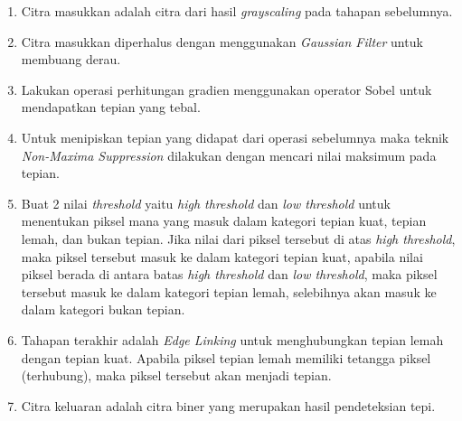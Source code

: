 \begin{enumerate}[leftmargin=16pt]
\item Citra masukkan adalah citra dari hasil \textit{grayscaling} pada tahapan sebelumnya.
\item Citra masukkan diperhalus dengan menggunakan \textit{Gaussian Filter} untuk membuang derau.
\item Lakukan operasi perhitungan gradien menggunakan operator Sobel untuk mendapatkan tepian yang tebal.
\item Untuk menipiskan tepian yang didapat dari operasi sebelumnya maka teknik \textit{Non-Maxima Suppression} dilakukan dengan mencari nilai maksimum pada tepian.
\item Buat 2 nilai \textit{threshold} yaitu \textit{high threshold} dan \textit{low threshold} untuk menentukan piksel mana yang masuk dalam kategori tepian kuat, tepian lemah, dan bukan tepian. Jika nilai dari piksel tersebut di atas \textit{high threshold}, maka piksel tersebut masuk ke dalam kategori tepian kuat, apabila nilai piksel berada di antara batas \textit{high threshold} dan \textit{low threshold}, maka piksel tersebut masuk ke dalam kategori tepian lemah, selebihnya akan masuk ke dalam kategori bukan tepian.
\item Tahapan terakhir adalah \textit{Edge Linking} untuk menghubungkan tepian lemah dengan tepian kuat. Apabila piksel tepian lemah memiliki tetangga piksel (terhubung), maka piksel tersebut akan menjadi tepian.
\item Citra keluaran adalah citra biner yang merupakan hasil pendeteksian tepi.
\begin{adjustbox}{width=1\textwidth}
	\noindent\begin{minipage}{\linewidth}
		\label{fig:HasilDeteksiTepi}
	\end{minipage}
\end{adjustbox}\\
\end{enumerate}


